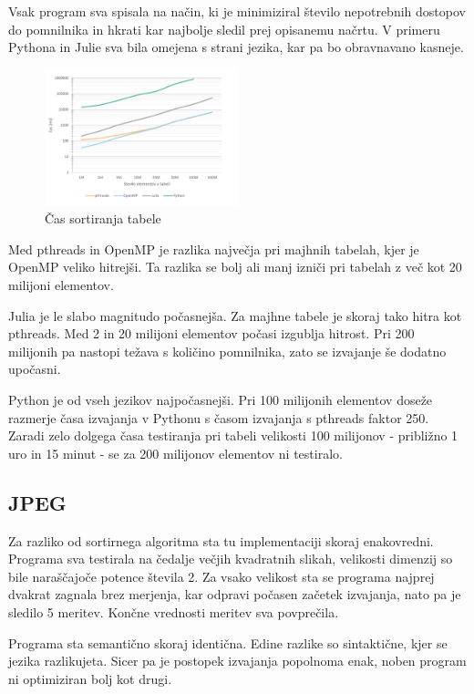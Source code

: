 \documentclass[journal,a4paper,twoside]{sty/IEEEtran}
\begin{document}
Vsak program sva spisala na način, ki je minimiziral število nepotrebnih dostopov do pomnilnika in hkrati kar najbolje sledil prej opisanemu načrtu.
V primeru Pythona in Julie sva bila omejena s strani jezika, kar pa bo obravnavano kasneje.

\begin{figure}[h]
\includegraphics[width=0.5\textwidth]{aqs_speed}
\caption{Čas sortiranja tabele}
\end{figure}

Med pthreads in OpenMP je razlika največja pri majhnih tabelah, kjer je OpenMP veliko hitrejši.
Ta razlika se bolj ali manj izniči pri tabelah z več kot 20 milijoni elementov.

Julia je le slabo magnitudo počasnejša.
Za majhne tabele je skoraj tako hitra kot pthreads.
Med 2 in 20 milijoni elementov počasi izgublja hitrost.
Pri 200 milijonih pa nastopi težava s količino pomnilnika, zato se izvajanje še dodatno upočasni.

Python je od vseh jezikov najpočasnejši.
Pri 100 milijonih elementov doseže razmerje časa izvajanja v Pythonu s časom izvajanja s pthreads faktor 250.
Zaradi zelo dolgega časa testiranja pri tabeli velikosti 100 milijonov - približno 1 uro in 15 minut - se za 200 milijonov elementov ni testiralo.

\subsection{JPEG}

Za razliko od sortirnega algoritma sta tu implementaciji skoraj enakovredni.
Programa sva testirala na čedalje večjih kvadratnih slikah, velikosti dimenzij so bile naraščajoče potence števila 2.
Za vsako velikost sta se programa najprej dvakrat zagnala brez merjenja, kar odpravi počasen začetek izvajanja, nato pa je sledilo 5 meritev.
Končne vrednosti meritev sva povprečila.

Programa sta semantično skoraj identična.
Edine razlike so sintaktične, kjer se jezika razlikujeta.
Sicer pa je postopek izvajanja popolnoma enak, noben program ni optimiziran bolj kot drugi.
\end{document}
